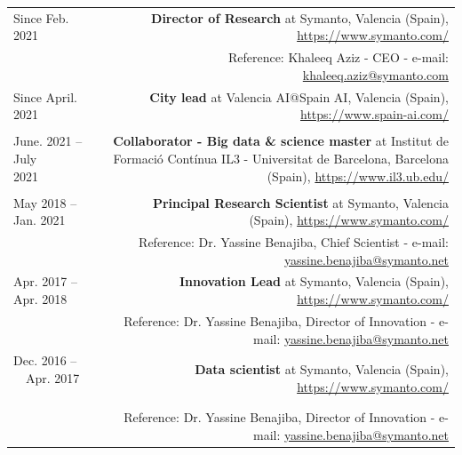 \documentclass[10pt]{article}
\begin{document}
\begin{tabular}{L!{\VRule}R}

Since Feb.~ 2021 &{\textbf{Director of Research} at Symanto, Valencia (Spain), \url{https://www.symanto.com/}}\\
&\scriptsize{Reference: Khaleeq Aziz - CEO - e-mail: \href{mailto:khaleeq.aziz@symanto.com}{khaleeq.aziz@symanto.com}}\\

Since April.~ 2021 &{\textbf{City lead} at Valencia AI@Spain AI, Valencia (Spain), \url{https://www.spain-ai.com/}}\\
&\\

June. 2021 -- July 2021~~~~~ &{\textbf{Collaborator - Big data \& science master} at  Institut de Formació Contínua IL3 - Universitat de Barcelona, Barcelona (Spain), \url{https://www.il3.ub.edu/}}\\
&\\

May 2018 -- Jan. 2021~~~ &{\textbf{Principal Research Scientist} at Symanto, Valencia (Spain), \url{https://www.symanto.com/}}\\
&\scriptsize{Reference: Dr. Yassine Benajiba, Chief Scientist - e-mail: \href{mailto:yassine.benajiba@symanto.net}{yassine.benajiba@symanto.net}}\\

Apr. 2017 -- Apr. 2018~~~ &{\textbf{Innovation Lead} at Symanto, Valencia (Spain), \url{https://www.symanto.com/}}\\
&\scriptsize{Reference: Dr. Yassine Benajiba, Director of Innovation - e-mail: \href{mailto:yassine.benajiba@symanto.net}{yassine.benajiba@symanto.net}}\\

Dec. 2016 -- ~~Apr. 2017 ~~&{\textbf{Data scientist} at Symanto, Valencia (Spain), \url{https://www.symanto.com/}}\\
&\scriptsize{Reference: Dr. Yassine Benajiba, Director of Innovation - e-mail: \href{mailto:yassine.benajiba@symanto.net}{yassine.benajiba@symanto.net}}\\



\end{tabular}
\end{document}
